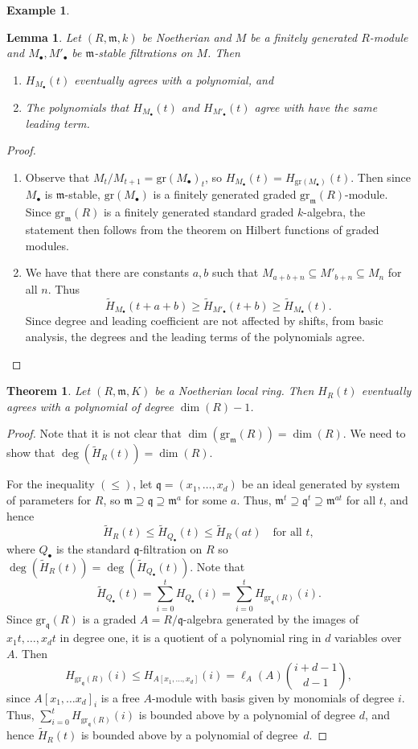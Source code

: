 \documentclass{amsart}[12pt]
\newcommand{\m}{{\mathfrak m}}
\newcommand{\q}{{\mathfrak q}}
\numberwithin{equation}{section}
\theoremstyle{plain} %
\newtheorem{thm}[equation]{Theorem}
\newtheorem{lemma}[equation]{Lemma}
\theoremstyle{definition}
\newtheorem{ex}[equation]{Example}
\theoremstyle{remark}
\newcommand{\gr}{\mathrm{gr}}
\begin{document}
\begin{ex}
\begin{lemma} Let $(R,\m,k)$ be Noetherian and $M$ be a finitely generated $R$-module and $M_\bullet, M'_\bullet$ be $\m$-stable filtrations on $M$. Then
\begin{enumerate}
\item $H_{M_\bullet}(t)$ eventually agrees with a polynomial, and
\item The polynomials that $H_{M_\bullet}(t)$ and $H_{M'_\bullet}(t)$ agree with have the same leading term.
\end{enumerate}
\end{lemma}
\begin{proof}
\begin{enumerate}
\item Observe that $M_t/M_{t+1} = \gr(M_\bullet)_{t}$, so $H_{M_\bullet}(t) = H_{\gr(M_\bullet)}(t)$. Then since $M_\bullet$ is $\m$-stable, $\gr(M_\bullet)$ is a finitely generated graded $\gr_{\m}(R)$-module. Since $\gr_{\m}(R)$ is a finitely generated standard graded $k$-algebra, the statement then follows from the theorem on Hilbert functions of graded modules.
\item We have that there are constants $a,b$ such that $M_{a+b+n} \subseteq M'_{b+n} \subseteq M_n$ for all $n$. Thus \[\widetilde{H}_{M_\bullet}(t+a+b) \geq \widetilde{H}_{M'_\bullet}(t+b) \geq \widetilde{H}_{M_\bullet}(t).\] Since degree and leading coefficient are not affected by shifts, from basic analysis, the degrees and the leading  terms of the polynomials agree.\qedhere
\end{enumerate}
\end{proof}


\begin{thm} Let $(R,\m,K)$ be a Noetherian local ring. Then $H_R(t)$ eventually agrees with a polynomial of degree $\dim(R)-1$.
\end{thm}
\begin{proof} Note that it is not clear that $\dim(\gr_{\m}(R))=\dim(R)$. We need to show that $\deg(\tilde{H}_R(t)) = \dim(R)$.

For the inequality $(\leq)$, let $\q=(x_1,\dots,x_d)$ be an ideal generated by system of parameters for $R$, so $\m \supseteq \q \supseteq \m^a$ for some $a$. Thus, $\m^t \supseteq \q^t \supseteq \m^{at}$ 
for all $t$, and hence \[ \tilde{H}_{R}(t)  \leq \tilde{H}_{Q_\bullet}(t) \leq \tilde{H}_{R}(at) \quad \text{for all $t$},\]
where $Q_\bullet$ is the standard $\q$-filtration on $R$  so $\deg(\tilde{H}_{R}(t)) = \deg(\tilde{H}_{Q_\bullet}(t)).$ Note that 
\[ \tilde{H}_{Q_\bullet}(t) = \sum_{i=0}^t H_{Q_\bullet}(i) = \sum_{i=0}^t H_{\gr_{\q}(R)}(i).\]
Since $\gr_{\q}(R)$ is a graded $A=R/\q$-algebra generated by the images of $x_1t,\dots,x_dt$ in degree one, it is a quotient of a polynomial ring in $d$ variables over $A$. Then
\[ H_{\gr_{\q}(R)}(i) \leq H_{A[x_1,\dots,x_d]}(i) = \ell_A(A) \binom{i+d-1}{d-1},\]
since $A[x_1,\dots x_d]_i$ is a free $A$-module with basis given by monomials of degree $i$. Thus, $\sum_{i=0}^t H_{\gr_{\q}(R)}(i)$ is bounded above by a polynomial of degree $d$, and hence $\tilde{H}_{R}(t) $ is bounded above by a polynomial of degree~$d$. 



\end{proof}
\end{ex}
\end{document}
